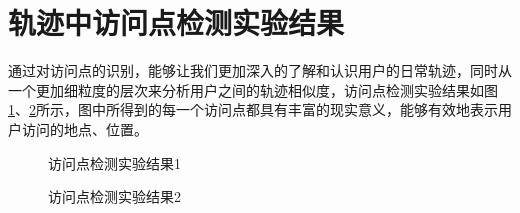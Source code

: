 \section{轨迹中访问点检测实验结果}
通过对访问点的识别，能够让我们更加深入的了解和认识用户的日常轨迹，同时从一个更加细粒度的层次来分析用户之间的轨迹相似度，访问点检测实验结果如图\ref{fig:SP_1}、\ref{fig:SP_2}所示，图中所得到的每一个访问点都具有丰富的现实意义，能够有效地表示用户访问的地点、位置。
\begin{figure}[htb]
  \centering%
  \hspace{4em}%
  \caption{访问点检测实验结果1}
  \label{fig:SP_1}
\end{figure}
\begin{figure}[htb]
  \centering%
  \hspace{4em}%
  \caption{访问点检测实验结果2}
  \label{fig:SP_2}
\end{figure}

